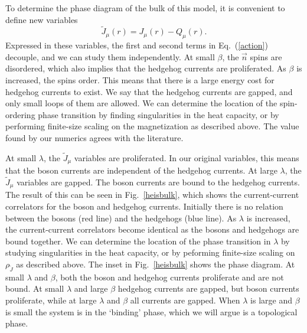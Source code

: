 \documentclass[prb,twocolumn]{revtex4-1}
\begin{document}
To determine the phase diagram of the bulk of this model, it is convenient to define new variables
\begin{equation}
\tilde J_\mu(r)=J_\mu(r)-Q_\mu(r).
\label{shift}
\end{equation}
Expressed in these variables, the first and second terms in Eq.~(\ref{action}) decouple, and we can study them independently. 
At small $\beta$, the $\vec{n}$ spins are disordered, which also implies that the hedgehog currents are proliferated. As $\beta$ is increased, the spins order. This means that there is a large energy cost for hedgehog currents to exist. We say that the hedgehog currents are gapped, and only small loops of them are allowed. We can determine the location of the spin-ordering phase transition by finding singularities in the heat capacity, or by performing finite-size scaling on the magnetization as described above. The value found by our numerics agrees with the literature.\cite{McKenzie2}

At small $\lambda$, the $\tilde J_\mu$ variables are proliferated. In our original variables, this means that the boson currents are independent of the hedgehog currents. At large $\lambda$, the $\tilde J_\mu$ variables are gapped. The boson currents are bound to the hedgehog currents. The result of this can be seen in Fig.~\ref{heisbulk}, which shows the current-current correlators for the boson and hedgehog currents. Initially there is no relation between the bosons (red line) and the hedgehogs (blue line). As $\lambda$ is increased, the current-current correlators become identical as the bosons and hedgehogs are bound together. We can determine the location of the phase transition in $\lambda$ by studying singularities in the heat capacity, or by peforming finite-size scaling on $\rho_{\tilde J}$ as described above. The inset in Fig.~\ref{heisbulk} shows the phase diagram. At small $\lambda$ and $\beta$, both the boson and hedgehog currents proliferate and are not bound. At small $\lambda$ and large $\beta$ hedgehog currents are gapped, but boson currents proliferate, while at large $\lambda$ and $\beta$ all currents are gapped. When $\lambda$ is large and $\beta$ is small the system is in the `binding' phase, which we will argue is a topological phase.
\end{document}
